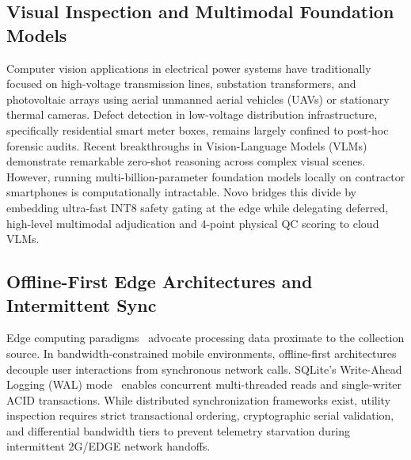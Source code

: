\documentclass[conference]{IEEEtran}
\begin{document}
\subsection{Visual Inspection and Multimodal Foundation Models}
Computer vision applications in electrical power systems have traditionally focused on high-voltage transmission lines, substation transformers, and photovoltaic arrays using aerial unmanned aerial vehicles (UAVs) or stationary thermal cameras. Defect detection in low-voltage distribution infrastructure, specifically residential smart meter boxes, remains largely confined to post-hoc forensic audits. Recent breakthroughs in Vision-Language Models (VLMs)~\cite{gemini2023team, liu2024visual} demonstrate remarkable zero-shot reasoning across complex visual scenes. However, running multi-billion-parameter foundation models locally on contractor smartphones is computationally intractable. Novo bridges this divide by embedding ultra-fast INT8 safety gating at the edge while delegating deferred, high-level multimodal adjudication and 4-point physical QC scoring to cloud VLMs.

\subsection{Offline-First Edge Architectures and Intermittent Sync}
Edge computing paradigms~\cite{shi2016edge, satyanarayanan2017emergence} advocate processing data proximate to the collection source. In bandwidth-constrained mobile environments, offline-first architectures decouple user interactions from synchronous network calls. SQLite's Write-Ahead Logging (WAL) mode~\cite{hipp2020sqlite} enables concurrent multi-threaded reads and single-writer ACID transactions. While distributed synchronization frameworks exist, utility inspection requires strict transactional ordering, cryptographic serial validation, and differential bandwidth tiers to prevent telemetry starvation during intermittent 2G/EDGE network handoffs.
\end{document}

